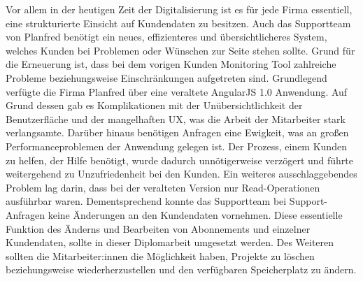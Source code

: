 Vor allem in der heutigen Zeit der Digitalisierung ist es f\"ur jede Firma essentiell, eine strukturierte Einsicht auf Kundendaten zu besitzen. Auch das Supportteam von Planfred benötigt ein neues, effizienteres und \"ubersichtlicheres System, welches Kunden bei Problemen oder W\"unschen zur Seite stehen sollte. Grund für die Erneuerung ist, dass bei dem vorigen Kunden Monitoring Tool zahlreiche Probleme beziehungsweise Einschränkungen aufgetreten sind.
\newline
Grundlegend verf\"ugte die Firma Planfred \"uber eine veraltete AngularJS 1.0 Anwendung. Auf Grund dessen gab es Komplikationen mit der Un\"ubersichtlichkeit der Benutzerfläche und der mangelhaften UX, was die Arbeit der Mitarbeiter stark verlangsamte. Dar\"uber hinaus benötigen Anfragen eine Ewigkeit, was an großen Performanceproblemen der Anwendung gelegen ist. Der Prozess, einem Kunden zu helfen, der Hilfe benötigt, wurde dadurch unnötigerweise verzögert und f\"uhrte weitergehend zu Unzufriedenheit bei den Kunden.
\newline
Ein weiteres ausschlaggebendes Problem lag darin, dass bei der veralteten Version nur Read-Operationen ausf\"uhrbar waren. Dementsprechend konnte das Supportteam bei Support-Anfragen keine Änderungen an den Kundendaten vornehmen. Diese essentielle Funktion des Änderns und Bearbeiten von Abonnements und einzelner Kundendaten, sollte in dieser Diplomarbeit umgesetzt werden. Des Weiteren sollten die Mitarbeiter:innen die Möglichkeit haben, Projekte zu löschen beziehungsweise wiederherzustellen und den verf\"ugbaren Speicherplatz zu ändern.